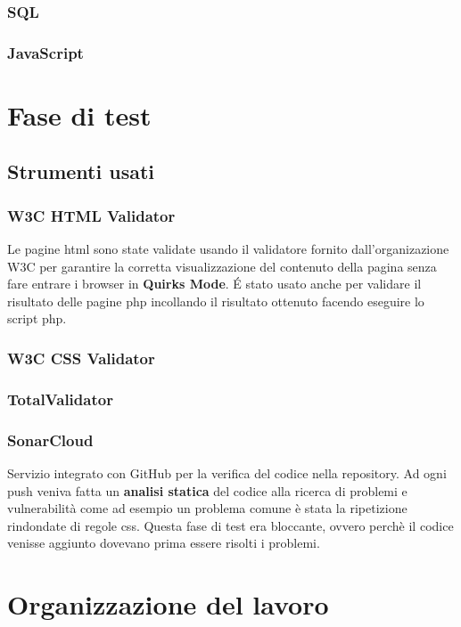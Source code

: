 \documentclass{article}
\begin{document}
			\subsubsection{SQL}
			\subsubsection{JavaScript}
	\section{Fase di test}
		\subsection{Strumenti usati}
			\subsubsection{W3C HTML Validator}
				Le pagine html sono state validate usando il validatore fornito dall'organizazione W3C per garantire la corretta visualizzazione del contenuto della pagina senza fare entrare i browser in {\bfseries Quirks Mode}. \'E stato usato anche per validare il risultato delle pagine php incollando il risultato ottenuto facendo eseguire lo script php.
			\subsubsection{W3C CSS Validator}
			\subsubsection{TotalValidator}
			\subsubsection{SonarCloud}
				Servizio integrato con GitHub per la verifica del codice nella repository. Ad ogni push veniva fatta un {\bfseries analisi statica} del codice alla ricerca di problemi e vulnerabilità come ad esempio un problema comune è stata la ripetizione rindondate di regole css. Questa fase di test era bloccante, ovvero perchè il codice venisse aggiunto dovevano prima essere risolti i problemi.
	\section{Organizzazione del lavoro}
		
\end{document}

